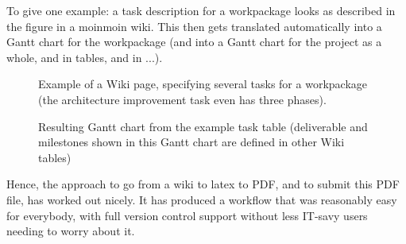 \documentclass[a4paper,10pt,english]{sphinxmanual}
\begin{document}
To give one example: a task description for a workpackage looks as described in the figure in a moinmoin wiki. This then gets translated automatically into a Gantt chart for the workpackage (and into a Gantt chart for the project as a whole, and in tables, and in ...).
\begin{figure}[htbp]
\centering
\capstart

\caption{Example of a Wiki page, specifying several tasks for a workpackage (the architecture improvement task even has three phases).}\end{figure}
\begin{figure}[htbp]
\centering
\capstart

\caption{Resulting Gantt chart from the example task table (deliverable and milestones shown in this Gantt chart are defined in other Wiki tables)}\end{figure}

Hence, the approach to go from a wiki to latex to PDF, and to submit this PDF file, has worked out nicely. It has produced a workflow that was reasonably easy for everybody, with full version control support without less IT-savy users needing to worry about it.
\end{document}
